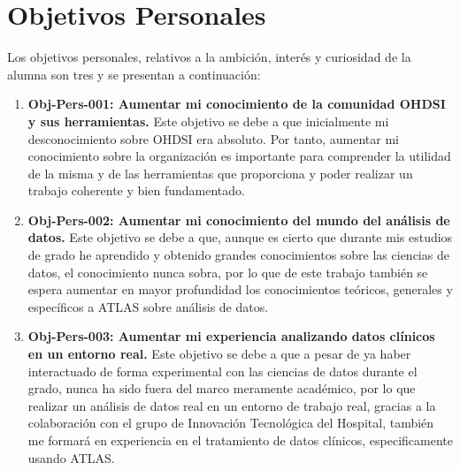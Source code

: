 \section{Objetivos Personales} \label{sec:02objPersonal}

Los objetivos personales, relativos a la ambición, interés y curiosidad de la alumna son tres y se presentan a continuación:

%

\begin{enumerate}

    \item \textbf{Obj-Pers-001: Aumentar mi conocimiento de la comunidad OHDSI y sus herramientas.} Este objetivo se debe a que inicialmente mi desconocimiento sobre  OHDSI era absoluto. Por tanto, aumentar mi conocimiento sobre la organización es importante para comprender la utilidad de la misma y de las herramientas que proporciona y poder realizar un trabajo coherente y bien fundamentado.

    \item \textbf{Obj-Pers-002: Aumentar mi conocimiento del mundo del análisis de datos.} Este objetivo se debe a que, aunque es cierto que durante mis estudios de grado he aprendido y obtenido grandes conocimientos sobre las ciencias de datos, el conocimiento nunca sobra, por lo que de este trabajo también se espera aumentar en mayor profundidad los conocimientos teóricos, generales y específicos a ATLAS sobre análisis de datos.

    \item \textbf{Obj-Pers-003: Aumentar mi experiencia analizando datos clínicos en un entorno real.} Este objetivo se debe a que a pesar de ya haber interactuado de forma experimental con las ciencias de datos durante el grado, nunca ha sido fuera del marco meramente académico, por lo que realizar un análisis de datos real en un entorno de trabajo real, gracias a la colaboración con el grupo de Innovación Tecnológica del Hospital, también me formará en experiencia en el tratamiento de datos clínicos, especificamente usando ATLAS.
    
\end{enumerate}



